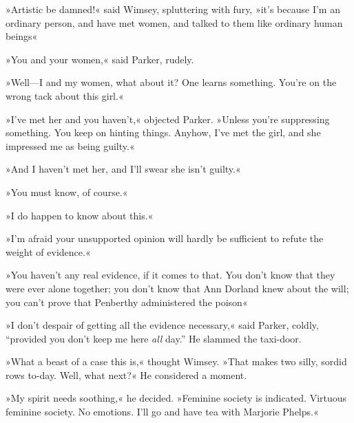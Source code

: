 »Artistic be damned!« said Wimsey, spluttering with fury, »it's because I'm an ordinary person, and have met women, and talked to them like ordinary human beings\longdash«

»You and your women,« said Parker, rudely.

»Well—I and my women, what about it? One learns something. You're on the wrong tack about this girl.«

»I've met her and you haven't,« objected Parker. »Unless you're suppressing something. You keep on hinting things. Anyhow, I've met the girl, and she impressed me as being guilty.«

»And I haven't met her, and I'll swear she isn't guilty.«

»You must know, of course.«

»I do happen to know about this.«

»I'm afraid your unsupported opinion will hardly be sufficient to refute the weight of evidence.«

»You haven't any real evidence, if it comes to that. You don't know that they were ever alone together; you don't know that Ann Dorland knew about the will; you can't prove that Penberthy administered the poison\longdash«

»I don't despair of getting all the evidence necessary,« said Parker, coldly, \enquote{provided you don't keep me here \textit{all} day.} He slammed the taxi-door.

»What a beast of a case this is,« thought Wimsey. »That makes two silly, sordid rows to-day. Well, what next?« He considered a moment.

»My spirit needs soothing,« he decided. »Feminine society is indicated. Virtuous feminine society. No emotions. I'll go and have tea with Marjorie Phelps.«
